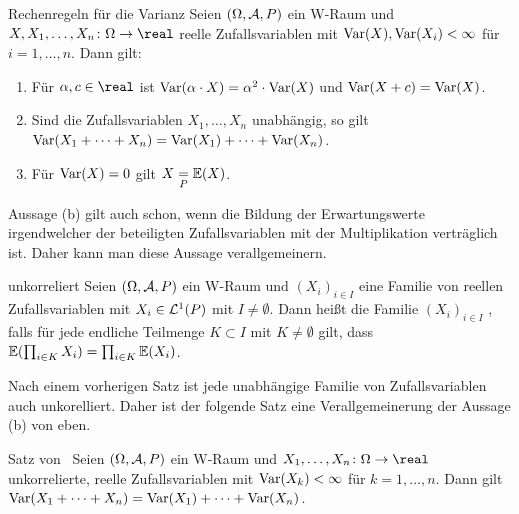 \begin{Satz}{Rechenregeln für die Varianz}
    Seien $(\Omega, \mathcal{A}, P)$ ein W-Raum und $X, X_1, \dotsc, X_n\colon \Omega \rightarrow \real$
    reelle Zufallsvariablen mit $\text{Var}(X), \text{Var}(X_i) < \infty$ für $i = 1, \dotsc, n$.
    Dann gilt:
    \begin{enumerate}
        \item
        Für $\alpha, c \in \real$ ist $\text{Var}(\alpha \cdot X) = \alpha^2 \cdot \text{Var}(X)$ und
        $\text{Var}(X + c) = \text{Var}(X)$.

        \item
        Sind die Zufallsvariablen $X_1, \dotsc, X_n$ unabhängig, so gilt\\
        $\text{Var}(X_1 + \dotsb + X_n) = \text{Var}(X_1) + \dotsb + \text{Var}(X_n)$.

        \item
        Für $\text{Var}(X) = 0$ gilt $X \underset{P}{=} \mathbb{E}(X)$.
    \end{enumerate}
\end{Satz}

\linie
\pagebreak

\begin{Bem}
    Aussage (b) gilt auch schon, wenn die Bildung der Erwartungswerte irgendwelcher der beteiligten
    Zufallsvariablen mit der Multiplikation verträglich ist.
    Daher kann man diese Aussage verallgemeinern.
\end{Bem}

\begin{Def}{unkorreliert}
    Seien $(\Omega, \mathcal{A}, P)$ ein W-Raum und $(X_i)_{i \in I}$ eine Familie von
    reellen Zufallsvariablen mit $X_i \in \mathcal{L}^1(P)$ mit $I \not= \emptyset$.
    Dann heißt die Familie $(X_i)_{i \in I}$ , falls für jede
    endliche Teilmenge $K \subset I$ mit $K \not= \emptyset$ gilt, dass
    $\mathbb{E}(\prod_{i \in K} X_i) = \prod_{i \in K} \mathbb{E}(X_i)$.
\end{Def}

\begin{Bem}
    Nach einem vorherigen Satz ist jede unabhängige Familie von Zufallsvariablen auch
    unkorelliert.
    Daher ist der folgende Satz eine Verallgemeinerung der Aussage (b) von eben.
\end{Bem}

\begin{Satz}{Satz von \upshape\,\!}
    Seien $(\Omega, \mathcal{A}, P)$ ein W-Raum und $X_1, \dotsc, X_n\colon \Omega \rightarrow \real$
    unkorrelierte, reelle Zufallsvariablen mit $\text{Var}(X_k) < \infty$ für $k = 1, \dotsc, n$.
    Dann gilt $\text{Var}(X_1 + \dotsb + X_n) = \text{Var}(X_1) + \dotsb + \text{Var}(X_n)$.
\end{Satz}

